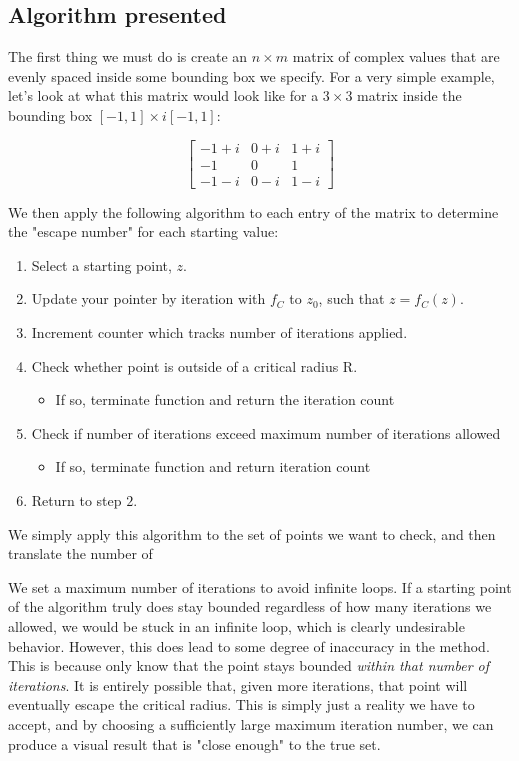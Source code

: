 \documentclass[12pt]{article}
\begin{document}
\subsection{Algorithm presented}

The first thing we must do is create an $n \times m$ matrix of complex values that are evenly spaced inside some bounding box we specify. For a very simple example, let's look at what this matrix would look like for a $3 \times 3$ matrix inside the bounding box $[-1, 1] \times i[-1, 1]$:

\begin{equation*}
\begin{bmatrix}
-1 + i & 0 + i & 1 + i \\
-1 & 0 & 1 \\
-1-i & 0-i & 1-i
\end{bmatrix}
\end{equation*}

We then apply the following algorithm to each entry of the matrix to determine the "escape number" for each starting value:

\begin{enumerate}
	\item Select a starting point, $z$. 
	\item Update your pointer by iteration with $f_C$ to $z_0$, such that $z = f_C(z)$.
	\item Increment counter which tracks number of iterations applied. 
	\item Check whether point is outside of a critical radius R.
	\begin{itemize}
		\item If so, terminate function and return the iteration count
	\end{itemize}
	\item Check if number of iterations exceed maximum number of iterations allowed
	\begin{itemize}
		\item If so, terminate function and return iteration count
	\end{itemize}
	\item Return to step $2.$
	
\end{enumerate}

We simply apply this algorithm to the set of points we want to check, and then translate the number of 

We set a maximum number of iterations to avoid infinite loops. If a starting point of the algorithm truly does stay bounded regardless of how many iterations we allowed, we would be stuck in an infinite loop, which is clearly undesirable behavior. However, this does lead to some degree of inaccuracy in the method. This is because only know that the point stays bounded \textit{within that number of iterations}. It is entirely possible that, given more iterations, that point will eventually escape the critical radius. This is simply just a reality we have to accept, and by choosing a sufficiently large maximum iteration number, we can produce a visual result that is "close enough" to the true set. 
\end{document}
